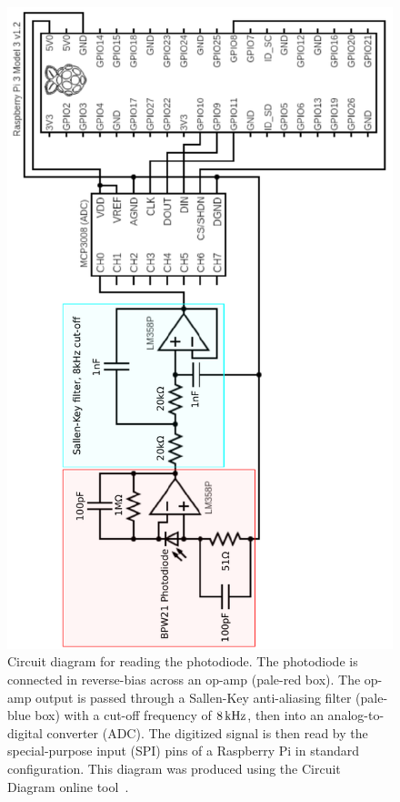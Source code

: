 \documentclass[aps,pra,superscriptaddress,reprint]{revtex4-2}
\begin{document}
\begin{figure}
	\includegraphics[angle=-90,width=.8\textwidth]{figures/circuit_diagram_2.pdf}
	\caption{\label{fig:circuit_diagram}
Circuit diagram for reading the photodiode. 
The photodiode is connected in reverse-bias across an op-amp (pale-red box). 
The op-amp output is passed through a Sallen-Key anti-aliasing filter (pale-blue box) with a cut-off frequency of $8\,{\rm kHz}$, then into an analog-to-digital converter (ADC). 
The digitized signal is then read by the special-purpose input (SPI) pins of a Raspberry Pi in standard configuration.
This diagram was produced using the Circuit Diagram online tool~\cite{CircuitDiagram:online}. %
}
\end{figure}
\end{document}
